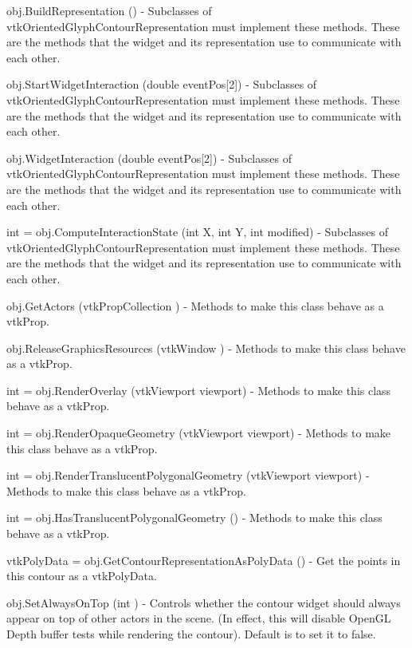 \begin{DoxyItemize}
\item {\ttfamily obj.\-Build\-Representation ()} -\/ Subclasses of vtk\-Oriented\-Glyph\-Contour\-Representation must implement these methods. These are the methods that the widget and its representation use to communicate with each other.  
\item {\ttfamily obj.\-Start\-Widget\-Interaction (double event\-Pos\mbox{[}2\mbox{]})} -\/ Subclasses of vtk\-Oriented\-Glyph\-Contour\-Representation must implement these methods. These are the methods that the widget and its representation use to communicate with each other.  
\item {\ttfamily obj.\-Widget\-Interaction (double event\-Pos\mbox{[}2\mbox{]})} -\/ Subclasses of vtk\-Oriented\-Glyph\-Contour\-Representation must implement these methods. These are the methods that the widget and its representation use to communicate with each other.  
\item {\ttfamily int = obj.\-Compute\-Interaction\-State (int X, int Y, int modified)} -\/ Subclasses of vtk\-Oriented\-Glyph\-Contour\-Representation must implement these methods. These are the methods that the widget and its representation use to communicate with each other.  
\item {\ttfamily obj.\-Get\-Actors (vtk\-Prop\-Collection )} -\/ Methods to make this class behave as a vtk\-Prop.  
\item {\ttfamily obj.\-Release\-Graphics\-Resources (vtk\-Window )} -\/ Methods to make this class behave as a vtk\-Prop.  
\item {\ttfamily int = obj.\-Render\-Overlay (vtk\-Viewport viewport)} -\/ Methods to make this class behave as a vtk\-Prop.  
\item {\ttfamily int = obj.\-Render\-Opaque\-Geometry (vtk\-Viewport viewport)} -\/ Methods to make this class behave as a vtk\-Prop.  
\item {\ttfamily int = obj.\-Render\-Translucent\-Polygonal\-Geometry (vtk\-Viewport viewport)} -\/ Methods to make this class behave as a vtk\-Prop.  
\item {\ttfamily int = obj.\-Has\-Translucent\-Polygonal\-Geometry ()} -\/ Methods to make this class behave as a vtk\-Prop.  
\item {\ttfamily vtk\-Poly\-Data = obj.\-Get\-Contour\-Representation\-As\-Poly\-Data ()} -\/ Get the points in this contour as a vtk\-Poly\-Data.  
\item {\ttfamily obj.\-Set\-Always\-On\-Top (int )} -\/ Controls whether the contour widget should always appear on top of other actors in the scene. (In effect, this will disable Open\-G\-L Depth buffer tests while rendering the contour). Default is to set it to false.  

\end{DoxyItemize}
